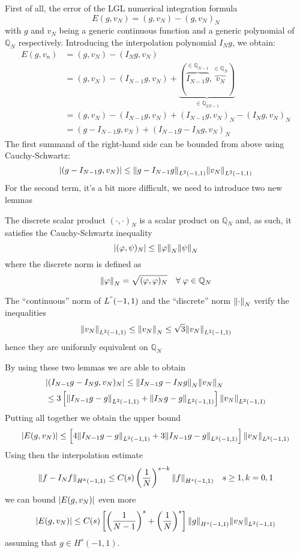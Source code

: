 First of all, the error of the LGL numerical integration formula 
\[
    E(g, v_N) = (g, v_N) - (g, v_N)_N
\]
with \(g\) and \(v_N\) being a generic continuous function and a generic polynomial of \(\mathbb{Q}_N\) respectively. Introducing the interpolation polynomial \(I_Ng\), we obtain:
\begin{align*}
    E(g, v_n) &= (g, v_N) - (I_Ng, v_N) \\
    &= (g, v_N) - (I_{N-1}g, v_N) + \underbrace{(\overbrace{I_{N-1}g}^{\in \mathbb{Q}_{N-1}}, \overbrace{v_N}^{\in \mathbb{Q}_N})}_{\in \mathbb{Q}_{2N-1}} \\
    &= (g, v_N) - (I_{N-1}g, v_N) +(I_{N-1}g, v_N)_N - (I_{N}g, v_N)_N \\
    &= (g - I_{N-1}g, v_N) + (I_{N-1}g - I_N g, v_N)_N
\end{align*}
The first summand of the right-hand side can be bounded from above using Cauchy-Schwartz:
\[
    \abs{(g-I_{N-1}g, v_N)} \leq \norm{g-I_{N-1}g}_{L^2(-1,1)}\norm{v_N}_{L^2(-1,1)}
\]
For the second term, it's a bit more difficult, we need to introduce two new lemmas
\begin{lemma}
    The discrete scalar product \((\cdot, \cdot)_N\) is a scalar product on \(\mathbb{Q}_N\) and, as such, it satisfies the Cauchy-Schwartz inequality
    \[
        \abs{(\varphi, \psi)_N} \leq \norm{\varphi}_N \norm{\psi}_N
    \]
    where the discrete norm is defined as 
    \[
        \norm{\varphi}_N = \sqrt{(\varphi, \varphi)_N} \quad \forall \; \varphi \in \mathbb{Q}_N
    \]
\end{lemma}
\begin{lemma}
    The ``continuous'' norm of \(L^"(-1,1)\) and the ``discrete'' norm \(\norm{\cdot}_N\) verify the inequalities
    \[
        \norm{v_N}_{L^2(-1,1)} \leq \norm{v_N}_N \leq \sqrt{3}\norm{v_N}_{L^2(-1,1)}
    \]
    hence they are uniformly equivalent on \(\mathbb{Q}_N\)
\end{lemma}
By using these two lemmas we are able to obtain 
\begin{equation*}
    \begin{split}
        &\abs{(I_{N-1}g - I_Ng, v_N)_N} \leq \norm{I_{N-1}g - I_Ng}_N \norm{v_N}_N  \\
        &\leq 3 \left[\norm{I_{N-1}g-g}_{L^2(-1,1)} + \norm{I_{N}g-g}_{L^2(-1,1)}\right] \norm{v_N}_{L^2(-1,1)}
    \end{split}
\end{equation*}
Putting all together we obtain the upper bound 
\[
    \abs{E(g,v_N)} \leq \left[4\norm{I_{N-1}g-g}_{L^2(-1,1)} + 3 \norm{I_{N-1}g-g}_{L^2(-1,1)} \right] \norm{v_N}_{L^2(-1,1)}
\]
Using then the interpolation estimate 
\[
    \norm{f- I_Nf}_{H^k(-1,1)} \leq C(s)\left(\frac{1}{N}\right)^{s-k} \norm{f}_{H^s(-1,1)} \quad s \geq 1, k = 0,1
\]
we can bound \(\abs{E(g,v_N)}\) even more
\[
    \abs{E(g,v_N)} \leq C(s)\left[\left(\frac{1}{N-1}\right)^s + \left(\frac{1}{N}\right)^s\right] \norm{g}_{H^s(-1,1)} \norm{v_N}_{L^2(-1,1)}
\]
assuming that \(g \in H^s(-1,1)\).


